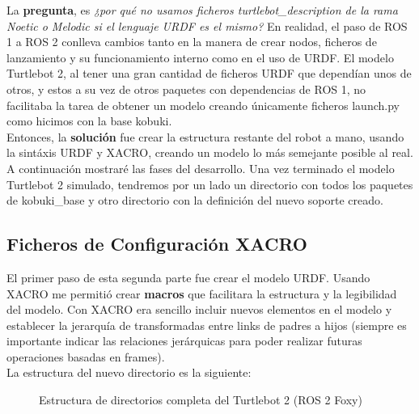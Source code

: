La \textbf{pregunta}, es \textit{¿por qué no usamos ficheros turtlebot\_description de la rama Noetic o Melodic si el lenguaje URDF es el mismo?} En realidad, el paso de ROS 1 a ROS 2 conlleva cambios tanto en la manera de crear nodos, ficheros de lanzamiento y su funcionamiento interno como en el uso de URDF. El modelo Turtlebot 2, al tener una gran cantidad de ficheros URDF que dependían unos de otros, y estos a su vez de otros paquetes con dependencias de ROS 1, no facilitaba la tarea de obtener un modelo creando únicamente ficheros launch.py como hicimos con la base kobuki.\\

Entonces, la \textbf{solución} fue crear la estructura restante del robot a mano, usando la sintáxis URDF y XACRO, creando un modelo lo más semejante posible al real. A continuación mostraré las fases del desarrollo. Una vez terminado el modelo Turtlebot 2 simulado, tendremos por un lado un directorio con todos los paquetes de kobuki\_base y otro directorio con la definición del nuevo soporte creado.\\



\subsection{Ficheros de Configuración XACRO}
\label{sec:turtlebot2_xacro}

El primer paso de esta segunda parte fue crear el modelo URDF. Usando XACRO me permitió crear \textbf{macros} que facilitara la estructura y la legibilidad del modelo. Con XACRO era sencillo incluir nuevos elementos en el modelo y establecer la jerarquía de transformadas entre links de padres a hijos (siempre es importante indicar las relaciones jerárquicas para poder realizar futuras operaciones basadas en frames).\\

La estructura del nuevo directorio es la siguiente:
\begin{figure}[H]
	\begin{center}
	    \setlength{\fboxsep}{0.5cm}
	    \caption{Estructura de directorios completa del Turtlebot 2 (ROS 2 Foxy)}
	    \label{fig:directorios_turtlebot2}
	\end{center}
\end{figure}\

